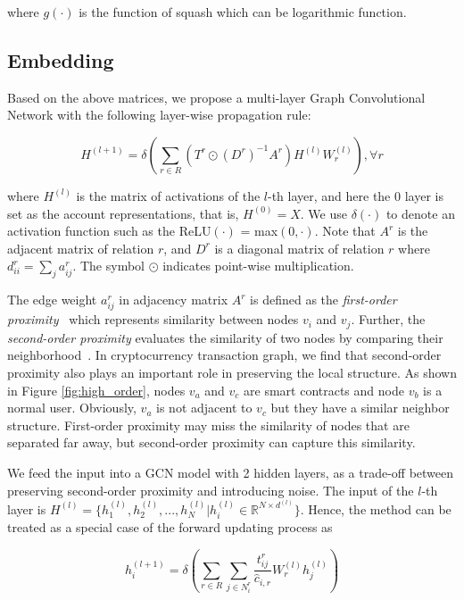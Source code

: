 \noindent where $g(\cdot)$ is the function of squash which can be logarithmic function.

\subsection{Embedding}
\label{sec:rGCN layers}
Based on the above matrices, we propose a multi-layer Graph Convolutional Network with the following layer-wise propagation rule:

\begin{equation}
H^{(l+1)}=\delta(\sum_{r\in R} (T^r\odot (D^r)^{-1}A^r)H^{(l)}W_r^{(l)}),\forall r
\end{equation}

\noindent where $H^{(l)}$ is the matrix of activations of the $l$-th layer, and here the $0$ layer is set as the account representations, that is, $H^{(0)}=X$. We use $\delta(\cdot)$ to denote an activation function such as the ReLU$(\cdot)$ = max$(0,\cdot)$. Note that $A^r$ is the adjacent matrix of relation $r$, and $D^r$ is a diagonal matrix of relation $r$ where $d^r_{ii}=\sum_{j}a^r_{ij}$. The symbol $\odot$ indicates point-wise multiplication.

The edge weight $a^r_{ij}$ in adjacency matrix $A^r$ is defined as the \emph{first-order proximity}~\cite{tang2015line} which represents similarity between nodes $v_i$ and $v_j$. Further, the \emph{second-order proximity} evaluates the similarity of two nodes by comparing their neighborhood~\cite{goyal2018graph}. In cryptocurrency transaction graph, we find that second-order proximity also plays an important role in preserving the local structure. As shown in Figure \ref{fig:high_order}, nodes $v_a$ and $v_c$ are smart contracts and node $v_b$ is a normal user. Obviously, $v_a$ is not adjacent to $v_c$  but they have a similar neighbor structure. First-order proximity may miss the similarity of nodes that are separated far away, but second-order proximity can capture this similarity.

We feed the input into a GCN model with 2 hidden layers, as a trade-off between preserving second-order proximity and introducing noise. The input of the $l$-th layer is $H^{(l)}=\{h_1^{(l)},h_2^{(l)},...,h_N^{(l)}|h_i^{(l)}\in \mathbb{R}^{N \times d^{(l)}}\}$. Hence, the method can be treated as a special case of the forward updating process as

\begin{equation}
h_i^{(l+1)}=\delta(\sum_{r\in R} \sum_{j \in N_i^r} \frac{t_{ij}^r}{\hat c_{i,r}}W_r^{(l)}h_j^{(l)})
\end{equation}

